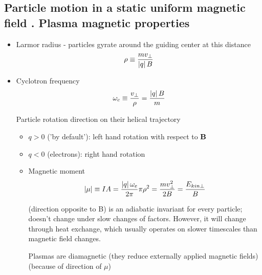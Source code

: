 	\subsection{Particle motion in a static uniform magnetic field . Plasma magnetic properties} 
		\begin{itemize}
			\item Larmor radius - particles gyrate around the guiding center at this distance
			\[\rho \equiv \frac{m v_{\perp}}{\left| q \right| B}\]
			\item Cyclotron frequency
			\[\omega_c \equiv \frac{v_{\perp}}{\rho} = \frac{\left| q \right| B}{m}\]
			
			Particle rotation direction on their helical trajectory
			\begin{itemize}
			\item $q>0$ ('by default'): left hand rotation with respect to $\mathbf{B}$
			\item $q<0$ (electrons): right hand rotation
			
			\item Magnetic moment
			\[\left| \mathbf{\mu} \right| \equiv I A = \frac{\left| q \right|\omega_e}{2\pi} \pi \rho^2 = \frac{m v_{\perp}^2}{2 B} = \frac{E_{kin \perp}}{B}\]
			
			(direction opposite to B)
			is an adiabatic invariant for every particle; doesn't change under slow changes of factors. However, it will change through heat exchange, which usually operates on slower timescales than magnetic field changes.
			
			Plasmas are diamagnetic (they reduce externally applied magnetic fields) (because of direction of $\mu$)
			\end{itemize}
		\end{itemize}

